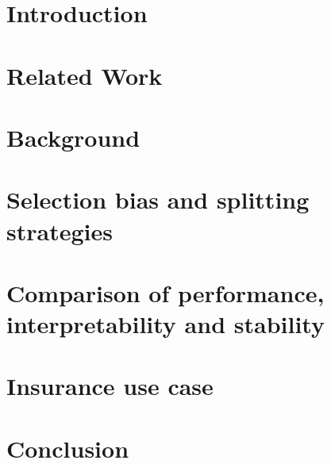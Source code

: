 \documentclass[12pt]{article}
\begin{document}
\newpage
\tableofcontents

\newpage


    
\section{Introduction}
\label{intro}

\newpage

\section{Related Work}
\label{related}

\newpage

\section{Background}
\label{background}

\newpage

\section{Selection bias and splitting strategies}
\label{selection}

\newpage

\section{Comparison of performance, interpretability and stability}
\label{simulation}

\newpage
\clearpage

\section{Insurance use case}
\label{usecase}

\newpage

\clearpage


\section{Conclusion}
\label{conclusion}

\end{document}
